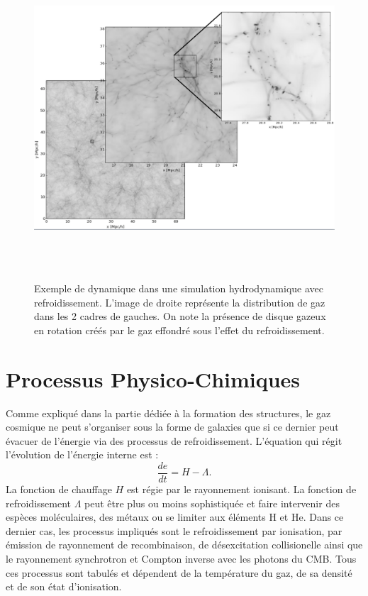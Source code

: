 \begin{figure}[htbp]
	\centering
		\includegraphics[height=12cm]{figs/zoom.png}
	\caption[Exemple de dynamique dans une simulation hydrodynamique avec refroidissement.]{Exemple de dynamique dans une simulation hydrodynamique avec refroidissement. L'image de droite représente la distribution de gaz dans les 2 cadres de gauches. On note la présence de disque gazeux en rotation créés par le gaz effondré sous l'effet du refroidissement.}
	\label{f:zoom}
\end{figure}


\section{Processus Physico-Chimiques}
Comme expliqué dans la partie dédiée à la formation des structures, le gaz cosmique ne peut s'organiser sous la forme de galaxies que si ce dernier peut évacuer de l'énergie via des processus de refroidissement. L'équation qui régit l'évolution de l'énergie interne est :
\begin{equation}
\frac{de}{dt}=H-\Lambda.
\end{equation}
La fonction de chauffage $H$ est régie par le rayonnement ionisant. La fonction de refroidissement $\Lambda$ peut être plus ou moins sophistiquée et faire intervenir des espèces moléculaires, des métaux  ou se limiter aux éléments H et He. Dans ce dernier cas, les processus impliqués sont le refroidissement par ionisation, par émission de rayonnement de recombinaison, de désexcitation collisionelle ainsi que le rayonnement synchrotron et Compton inverse avec les photons du CMB. Tous ces processus sont tabulés et dépendent de la température du gaz, de sa densité et de son état d'ionisation. 

